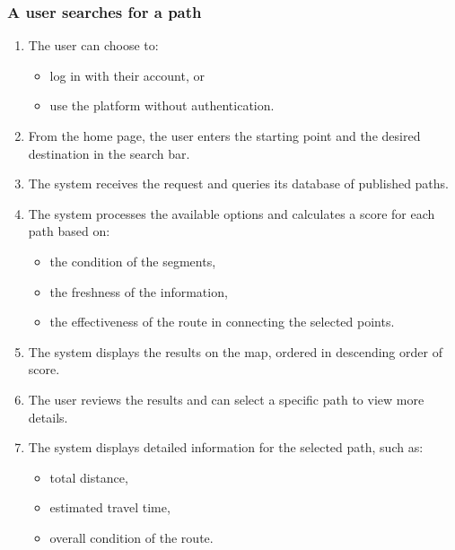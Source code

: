 \subsubsection*{A user searches for a path}
\begin{enumerate}
    \item The user can choose to:
        \begin{itemize}
            \item log in with their account, or
            \item use the platform without authentication.
        \end{itemize}
    \item From the home page, the user enters the starting point and the desired destination in the search bar.
    \item The system receives the request and queries its database of published paths.
    \item The system processes the available options and calculates a score for each path based on:
        \begin{itemize}
            \item the condition of the segments,
            \item the freshness of the information,
            \item the effectiveness of the route in connecting the selected points.
        \end{itemize}
    \item The system displays the results on the map, ordered in descending order of score.
    \item The user reviews the results and can select a specific path to view more details.
    \item The system displays detailed information for the selected path, such as:
        \begin{itemize}
            \item total distance,
            \item estimated travel time,
            \item overall condition of the route.
        \end{itemize}
\end{enumerate}
